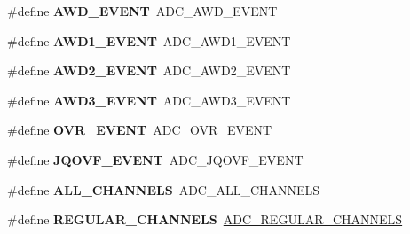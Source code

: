 \begin{DoxyCompactItemize}
\item 
\#define {\bfseries A\+W\+D\+\_\+\+E\+V\+E\+NT}~A\+D\+C\+\_\+\+A\+W\+D\+\_\+\+E\+V\+E\+NT\hypertarget{group___h_a_l___a_d_c___aliased___defines_ga21fdc6d3f5ae5c030acc0f5518fbea4a}{}\label{group___h_a_l___a_d_c___aliased___defines_ga21fdc6d3f5ae5c030acc0f5518fbea4a}

\item 
\#define {\bfseries A\+W\+D1\+\_\+\+E\+V\+E\+NT}~A\+D\+C\+\_\+\+A\+W\+D1\+\_\+\+E\+V\+E\+NT\hypertarget{group___h_a_l___a_d_c___aliased___defines_ga1429af679941d537c64f7004430fdf54}{}\label{group___h_a_l___a_d_c___aliased___defines_ga1429af679941d537c64f7004430fdf54}

\item 
\#define {\bfseries A\+W\+D2\+\_\+\+E\+V\+E\+NT}~A\+D\+C\+\_\+\+A\+W\+D2\+\_\+\+E\+V\+E\+NT\hypertarget{group___h_a_l___a_d_c___aliased___defines_ga04d97e3fb4776a8fae622cf88b442687}{}\label{group___h_a_l___a_d_c___aliased___defines_ga04d97e3fb4776a8fae622cf88b442687}

\item 
\#define {\bfseries A\+W\+D3\+\_\+\+E\+V\+E\+NT}~A\+D\+C\+\_\+\+A\+W\+D3\+\_\+\+E\+V\+E\+NT\hypertarget{group___h_a_l___a_d_c___aliased___defines_gabb3f690eef894c37c3f2c49e1d8c6c06}{}\label{group___h_a_l___a_d_c___aliased___defines_gabb3f690eef894c37c3f2c49e1d8c6c06}

\item 
\#define {\bfseries O\+V\+R\+\_\+\+E\+V\+E\+NT}~A\+D\+C\+\_\+\+O\+V\+R\+\_\+\+E\+V\+E\+NT\hypertarget{group___h_a_l___a_d_c___aliased___defines_gaf63a166dce844ba44197109fe3a3d02f}{}\label{group___h_a_l___a_d_c___aliased___defines_gaf63a166dce844ba44197109fe3a3d02f}

\item 
\#define {\bfseries J\+Q\+O\+V\+F\+\_\+\+E\+V\+E\+NT}~A\+D\+C\+\_\+\+J\+Q\+O\+V\+F\+\_\+\+E\+V\+E\+NT\hypertarget{group___h_a_l___a_d_c___aliased___defines_gae63ff704e73ca97890da8a07e141bb96}{}\label{group___h_a_l___a_d_c___aliased___defines_gae63ff704e73ca97890da8a07e141bb96}

\item 
\#define {\bfseries A\+L\+L\+\_\+\+C\+H\+A\+N\+N\+E\+LS}~A\+D\+C\+\_\+\+A\+L\+L\+\_\+\+C\+H\+A\+N\+N\+E\+LS\hypertarget{group___h_a_l___a_d_c___aliased___defines_gac9dcdba2096f6b3adab742b8b1a256c2}{}\label{group___h_a_l___a_d_c___aliased___defines_gac9dcdba2096f6b3adab742b8b1a256c2}

\item 
\#define {\bfseries R\+E\+G\+U\+L\+A\+R\+\_\+\+C\+H\+A\+N\+N\+E\+LS}~\hyperlink{group___a_d_c__channels__type_gad47a927eded315f3dcb21df51ff778fd}{A\+D\+C\+\_\+\+R\+E\+G\+U\+L\+A\+R\+\_\+\+C\+H\+A\+N\+N\+E\+LS}\hypertarget{group___h_a_l___a_d_c___aliased___defines_ga9480bc25f45fc189111dba13103c404e}{}\label{group___h_a_l___a_d_c___aliased___defines_ga9480bc25f45fc189111dba13103c404e}


\end{DoxyCompactItemize}
